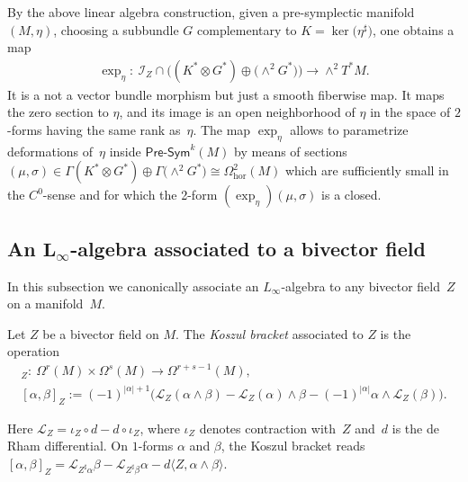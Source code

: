 \documentclass[pdftex]{sigma}
\numberwithin{equation}{section}
\newcommand{\Presym}{\mathsf{Pre}\textrm{-}\mathsf{Sym}}
\newcommand{\hor}{\mathrm{hor}}
\newcommand{\Lie}{\mathcal{L}}
\begin{document}
\begin{Remark}\label{rem:parametrize}By the above linear algebra construction, given a pre-symplectic manifold $(M,\eta)$, choosing a subbundle $G$ complementary to $K=\ker\big(\eta^\sharp\big)$, one obtains a map
\begin{gather}\label{eq:expetavb}
\exp_{\eta}\colon \ {\mathcal{I}_Z} \cap \big((K^*\otimes G^*)\oplus \big({\wedge}^2 G^*\big)\big) \to \wedge^2 T^*M.
\end{gather}
It is a not a vector bundle morphism but just a smooth fiberwise map. It maps the zero section to $\eta$, and its image is an open neighborhood of $\eta$ in the space of $2$-forms having the same rank as~$\eta$. The map $\exp_{\eta}$ allows to parametrize deformations of~$\eta$ inside $\Presym^k(M)$ by means of sections $(\mu, \sigma)\in \Gamma(K^*\otimes G^*)\oplus \Gamma\big({\wedge}^2 G^*\big) \cong \Omega_\hor^2(M)$ which are sufficiently small in the $C^0$-sense and for which the 2-form $(\exp_{\eta})(\mu,\sigma)$ is a closed.
\end{Remark}

\subsection[An $L_\infty$-algebra associated to a bivector field]{An $\boldsymbol{L_\infty}$-algebra associated to a bivector field}\label{subsection: Koszul for bivectors}

In this subsection we canonically associate an $L_\infty$-algebra to any bivector field~$Z$ on a manifold~$M$.

\begin{Definition}\label{definition: Koszul bracket of bivector field}Let $Z$ be a bivector field on $M$. The {\em Koszul bracket} associated to $Z$ is the operation
\begin{gather*}
 [\cdot,\cdot]_Z\colon \ \Omega^r(M) \times \Omega^s(M) \to \Omega^{r+s-1}(M),\\
 [\alpha,\beta]_Z:=(-1)^{|\alpha|+1} \big (\Lie_Z(\alpha\wedge \beta)-\Lie_Z(\alpha)\wedge \beta - (-1)^{|\alpha|}\alpha \wedge \Lie_Z(\beta)\big).
 \end{gather*}
\end{Definition}

Here $\Lie_Z = \iota_Z \circ d - d \circ \iota_Z$, where $\iota_Z$ denotes contraction with~$Z$ and~$d$ is the de Rham differential. On $1$-forms $\alpha$ and $\beta$, the Koszul bracket reads $[\alpha,\beta]_Z=\Lie_{Z^{\sharp}\alpha} \beta -\Lie_{Z^{\sharp}\beta} \alpha-d\langle Z, \alpha\wedge \beta\rangle$.
\end{document}
